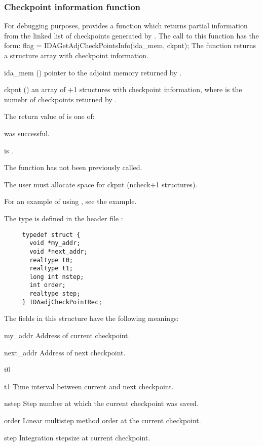 \subsubsection{Checkpoint information function}
For debugging purposes, {\idas} provides a function  which
returns partial information from the linked list of checkpoints generated by
. The call to this function has the form:
{
  flag = IDAGetAdjCheckPointsInfo(ida\_mem, ckpnt);
}
{
  The function  returns a structure array
  with checkpoint information.
}
{  
  \begin{args}
  \item[ida\_mem] ()
    pointer to the adjoint memory returned by .
  \item[ckpnt] ()
    an array of +1 structures with checkpoint information, where
     is the numebr of checkpoints returned by .
  \end{args}
}
{
  The return value  of  is one of:
  \begin{args}
  \item[\Id{IDA\_SUCCESS}] 
     was successful.
  \item[\Id{IDA\_MEM\_NULL}] 
     is .
  \item[\Id{IDA\_NO\_ADJ}]
    The function  has not been previously called.
  \end{args}
}
{
  {\warn}The user must allocate space for ckpnt (ncheck+1 structures).

  For an example of using , see the  
  example.
}
The type  is defined in the header file :
\begin{verbatim}
     typedef struct {
       void *my_addr;
       void *next_addr;
       realtype t0;
       realtype t1;
       long int nstep;
       int order;
       realtype step;
     } IDAadjCheckPointRec;
\end{verbatim}
The fields in this structure have the following meanings:
\begin{args}
\item[my\_addr]
  Address of current checkpoint.
\item[next\_addr]
  Address of next checkpoint.
\item[t0]
\item[t1]
  Time interval between current and next checkpoint.
\item[nstep]
  Step number at which the current checkpoint was saved.
\item[order]
  Linear multistep method order at the current checkpoint.
\item[step]
  Integration stepsize at current checkpoint.
\end{args}
